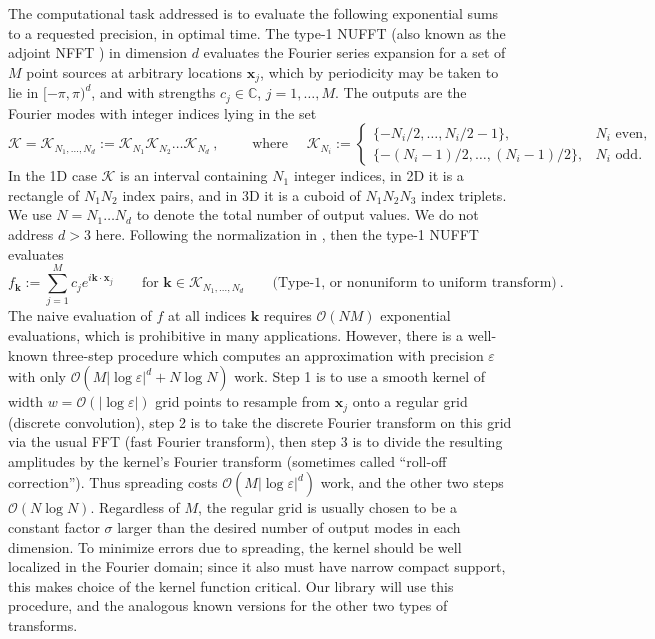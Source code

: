 \documentclass[10pt]{article}
\newcommand{\be}{\begin{equation}}
\newcommand{\ee}{\end{equation}}
\newcommand{\mbf}[1]{{\mathbf #1}}
\newcommand{\eps}{\varepsilon}
\newcommand{\bigO}{{\mathcal O}}
\newcommand{\xx}{\mbf{x}}
\newcommand{\kk}{\mbf{k}}
\newcommand{\KK}{{\mathcal K}}
\newcommand{\NU}{{nonuniform}}
\newcommand{\U}{{uniform}}
\newcommand{\rat}{\sigma}          %
\begin{document}
The computational task addressed
is to evaluate the following exponential sums to a requested precision,
in optimal time.
The type-1 NUFFT (also known as the adjoint NFFT \cite{usingnfft})
in dimension $d$ %
evaluates the Fourier series expansion for a set of
$M$ point sources at arbitrary locations $\xx_j$, which by periodicity
may be taken to lie in $[-\pi,\pi)^d$, and with
strengths $c_j\in\mathbb{C}$,  $j=1,\dots,M$.
The outputs are the Fourier modes with integer indices lying in
the set
\be
\KK = \KK_{N_1,\dots,N_d} := \KK_{N_1} \KK_{N_2} \dots \KK_{N_d}~,
\qquad\mbox{ where } \quad
\KK_{N_i} := \left\{\begin{array}{ll} \{-N_i/2,\ldots,N_i/2-1\}, & N_i \mbox{ even},\\
\{-(N_i-1)/2,\ldots,(N_i-1)/2\}, & N_i \mbox{ odd}.
\end{array}\right.
\label{KK}
\ee
In the 1D case $\KK$ is an interval containing $N_1$ integer indices, in 2D it is a rectangle of $N_1N_2$ index pairs, and in 3D it is a cuboid of $N_1N_2N_3$ index triplets.
We use $N=N_1\dots N_d$ to denote the total number of output values.
We do not address $d>3$ here.
Following the normalization in \cite{dutt,nufft}, then the type-1 NUFFT
evaluates
\be
f_\kk := %
\sum_{j=1}^M c_j e^{i \kk\cdot \xx_j}
\qquad \mbox{for } \kk \in \KK_{N_1,\dots,N_d}
\qquad \mbox{(Type-1, or \NU\ to \U\ transform)}
~.
\label{1}
\ee
The naive evaluation of $f$ at all indices $\kk$ requires $\bigO(NM)$
exponential evaluations, which is prohibitive
in many applications.
However, there is a well-known three-step procedure
which computes an approximation with precision $\eps$ with only
$\bigO(M |\log\eps|^d + N \log N)$ work.
Step 1 is to use a smooth kernel of width $w=\bigO(|\log\eps|)$
grid points to resample from $\xx_j$ onto a regular
grid (discrete convolution), step 2 is to
take the discrete Fourier transform on this grid via the usual FFT
(fast Fourier transform), then step 3 is
to divide the resulting amplitudes by the kernel's Fourier transform
(sometimes called ``roll-off correction'').
Thus spreading costs $\bigO(M|\log\eps|^d)$ work, and the other two
steps $\bigO(N \log N)$.
Regardless of $M$, the regular grid is usually chosen to be a constant factor
$\rat$ larger than the desired number of output modes in each dimension.
To minimize errors due to spreading, the kernel should be
well localized in the Fourier domain; since it also must have narrow compact
support, this makes choice of the kernel function critical.
Our library will use this procedure, and the analogous known versions
for the other two types of transforms.
\end{document}
